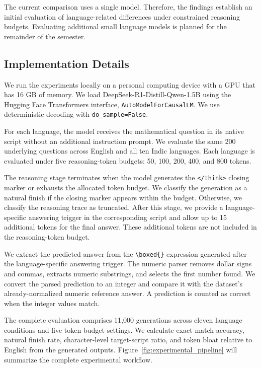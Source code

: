 \documentclass[11pt]{article}
\begin{document}
The current comparison uses a single model. Therefore, the findings establish an initial evaluation of language-related differences under constrained reasoning budgets. Evaluating additional small language models is planned for the remainder of the semester.


\subsection{Implementation Details}
\label{sec:implementation}

We run the experiments locally on a personal computing device with a GPU that has 16 GB of memory. We load DeepSeek-R1-Distill-Qwen-1.5B using the Hugging Face Transformers interface, \texttt{AutoModelForCausalLM}. We use deterministic decoding with \texttt{do\_sample=False}.

For each language, the model receives the mathematical question in its native script without an additional instruction prompt. We evaluate the same 200 underlying questions across English and all ten Indic languages. Each language is evaluated under five reasoning-token budgets: 50, 100, 200, 400, and 800 tokens.

The reasoning stage terminates when the model generates the \texttt{</think>} closing marker or exhausts the allocated token budget. We classify the generation as a natural finish if the closing marker appears within the budget. Otherwise, we classify the reasoning trace as truncated. After this stage, we provide a language-specific answering trigger in the corresponding script and allow up to 15 additional tokens for the final answer. These additional tokens are not included in the reasoning-token budget.


We extract the predicted answer from the \texttt{\textbackslash boxed\{\}}
expression generated after the language-specific answering trigger. The
numeric parser removes dollar signs and commas, extracts numeric
substrings, and selects the first number found. We convert the parsed
prediction to an integer and compare it with the dataset's already-normalized
numeric reference answer. A prediction is counted as correct when the
integer values match.


The complete evaluation comprises 11,000 generations across eleven language conditions and five token-budget settings. We calculate exact-match accuracy, natural finish rate, character-level target-script ratio, and token bloat relative to English from the generated outputs. Figure~\ref{fig:experimental_pipeline} will summarize the complete experimental workflow.
\end{document}
